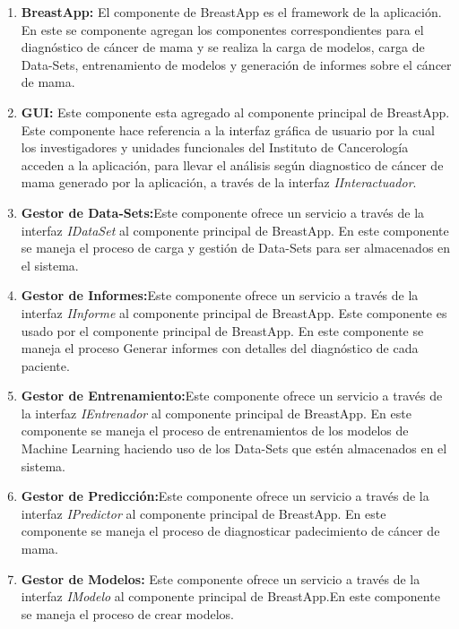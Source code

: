 \begin{enumerate}[label=\textbf{\arabic*})]
	
	\item  \textbf{BreastApp:} El componente de BreastApp es el framework  de la aplicación. En este se componente agregan los componentes correspondientes para el diagnóstico de cáncer de mama y se realiza la carga de modelos, carga de Data-Sets, entrenamiento de modelos  y generación de informes  sobre el cáncer de mama.
	\item  \textbf{GUI:} Este componente esta agregado al componente principal de BreastApp. Este componente hace referencia a la interfaz gráfica de usuario por la cual los investigadores y unidades funcionales del Instituto  de Cancerología acceden a la aplicación, para llevar el análisis según diagnostico de cáncer de mama generado por la aplicación, a través de la interfaz \textit{IInteractuador}.
	
	\item  \textbf{Gestor de Data-Sets:}Este componente ofrece un servicio a través de la interfaz \textit{IDataSet} al componente principal de BreastApp. En este componente se maneja el proceso de carga  y gestión de Data-Sets para ser almacenados en el sistema.
		
	\item  \textbf{Gestor de Informes:}Este componente ofrece un servicio a través de la interfaz \textit{IInforme} al componente principal de BreastApp. Este componente es usado por el componente principal de BreastApp. En este componente se maneja el proceso Generar informes con detalles del diagnóstico de cada paciente.
	
		
	\item  \textbf{Gestor de Entrenamiento:}Este componente ofrece un servicio a través de la interfaz \textit{IEntrenador} al componente principal de BreastApp. En este componente se maneja el proceso de entrenamientos de los modelos de Machine Learning haciendo uso de los Data-Sets  que estén almacenados en el sistema.
	
	\item  \textbf{Gestor de Predicción:}Este componente ofrece un servicio a través de la interfaz \textit{IPredictor} al componente principal de BreastApp. En este componente se maneja el proceso de diagnosticar padecimiento de cáncer de mama.
	
	\item  \textbf{Gestor de Modelos:} Este componente ofrece un servicio a través de la interfaz \textit{IModelo} al componente principal de BreastApp.En este componente se maneja el proceso de crear modelos.
\end{enumerate}

